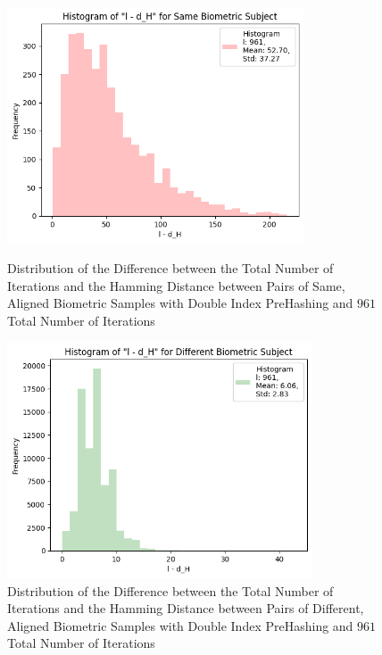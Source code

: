 \begin{enumerate}
\begin{itemize}
            \begin{figure}[H]
                \centering
                \begin{minipage}[b]{0.48\linewidth}
                    \centering
                    \includegraphics[width=\linewidth,height=7cm,keepaspectratio]{latex-img/l-dHconfig2_same.png}
                    \caption{Distribution of the Difference between the Total Number of Iterations and the Hamming Distance between Pairs of Same, Aligned Biometric Samples with Double Index PreHashing and $961$ Total Number of Iterations}
                    \label{l-dHconfig2_same}
                \end{minipage}
                \hfill
                \begin{minipage}[b]{0.48\linewidth}
                    \centering
                    \includegraphics[width=\linewidth,height=7cm,keepaspectratio]{latex-img/l-dHconfig2_diff.png}
                    \caption{Distribution of the Difference between the Total Number of Iterations and the Hamming Distance between Pairs of Different, Aligned Biometric Samples with Double Index PreHashing and $961$ Total Number of Iterations}
                    \label{l-dHconfig2_diff}
                \end{minipage}
            \end{figure}


\end{itemize}
\end{enumerate}
